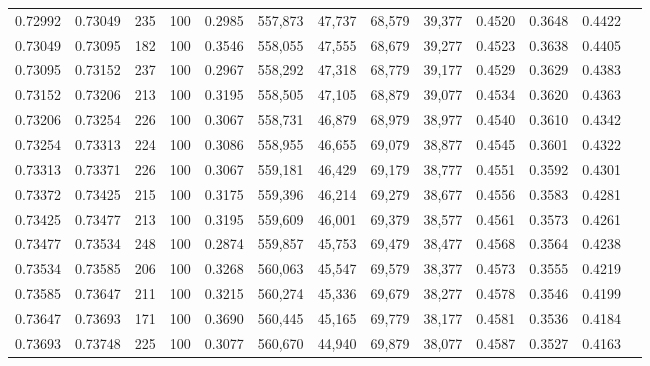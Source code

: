 \begin{tabular}{rrrrrrrrrrrrr}
0.72992 & 0.73049 &   235 & 100 &                                     0.2985 & 557,873 &  47,737 &  68,579 &  39,377 & 0.4520 & 0.3648 & 0.4422 \\
0.73049 & 0.73095 &   182 & 100 &                                     0.3546 & 558,055 &  47,555 &  68,679 &  39,277 & 0.4523 & 0.3638 & 0.4405 \\
0.73095 & 0.73152 &   237 & 100 &                                     0.2967 & 558,292 &  47,318 &  68,779 &  39,177 & 0.4529 & 0.3629 & 0.4383 \\
0.73152 & 0.73206 &   213 & 100 &                                     0.3195 & 558,505 &  47,105 &  68,879 &  39,077 & 0.4534 & 0.3620 & 0.4363 \\
0.73206 & 0.73254 &   226 & 100 &                                     0.3067 & 558,731 &  46,879 &  68,979 &  38,977 & 0.4540 & 0.3610 & 0.4342 \\
0.73254 & 0.73313 &   224 & 100 &                                     0.3086 & 558,955 &  46,655 &  69,079 &  38,877 & 0.4545 & 0.3601 & 0.4322 \\
0.73313 & 0.73371 &   226 & 100 &                                     0.3067 & 559,181 &  46,429 &  69,179 &  38,777 & 0.4551 & 0.3592 & 0.4301 \\
0.73372 & 0.73425 &   215 & 100 &                                     0.3175 & 559,396 &  46,214 &  69,279 &  38,677 & 0.4556 & 0.3583 & 0.4281 \\
0.73425 & 0.73477 &   213 & 100 &                                     0.3195 & 559,609 &  46,001 &  69,379 &  38,577 & 0.4561 & 0.3573 & 0.4261 \\
0.73477 & 0.73534 &   248 & 100 &                                     0.2874 & 559,857 &  45,753 &  69,479 &  38,477 & 0.4568 & 0.3564 & 0.4238 \\
0.73534 & 0.73585 &   206 & 100 &                                     0.3268 & 560,063 &  45,547 &  69,579 &  38,377 & 0.4573 & 0.3555 & 0.4219 \\
0.73585 & 0.73647 &   211 & 100 &                                     0.3215 & 560,274 &  45,336 &  69,679 &  38,277 & 0.4578 & 0.3546 & 0.4199 \\
0.73647 & 0.73693 &   171 & 100 &                                     0.3690 & 560,445 &  45,165 &  69,779 &  38,177 & 0.4581 & 0.3536 & 0.4184 \\
0.73693 & 0.73748 &   225 & 100 &                                     0.3077 & 560,670 &  44,940 &  69,879 &  38,077 & 0.4587 & 0.3527 & 0.4163 \\

\end{tabular}
